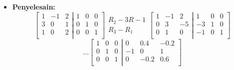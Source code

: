 \documentclass[pdflatex,compress,mathserif]{beamer}
\begin{document}
\begin{frame}
	\begin{itemize}
		\item \textbf{Penyelesain:}
		\[
			\left[
				\begin{matrix}
					1 & -1 & 2 \\
					3 & 0 & 1 \\
					1 & 0 & 2 \\
				\end{matrix}
			\right|
			\left.
				\begin{matrix}
					1 & 0 & 0 \\
					0 & 1 & 0 \\
					0 & 0 & 1 \\
				\end{matrix}
			\right]
			\begin{matrix}
				\\
				R_2 - 3R-1 \\
				R_3 - R_1\\
			\end{matrix}
			\left[
				\begin{matrix}
					1 & -1 & 2 \\
					0 & 3 & -5 \\
					0 & 1 & 0 \\
				\end{matrix}
			\right|
			\left.
				\begin{matrix}
					1 & 0 & 0 \\
					-3 & 1 & 0 \\
					-1 & 0 & 1 \\
				\end{matrix}
			\right]
		\]
		\[
		\dots
		\left[
			\begin{matrix}
				1 & 0 & 0 \\
				0 & 1 & 0 \\
				0 & 0 & 1 \\
			\end{matrix}
		\right|
		\left.
			\begin{matrix}
				0 & 0.4 & -0.2 \\
				-1 & 0 & 1 \\
				0 & -0.2 & 0.6 \\
			\end{matrix}
		\right]
		\]
	\end{itemize}
\end{frame}
\end{document}
